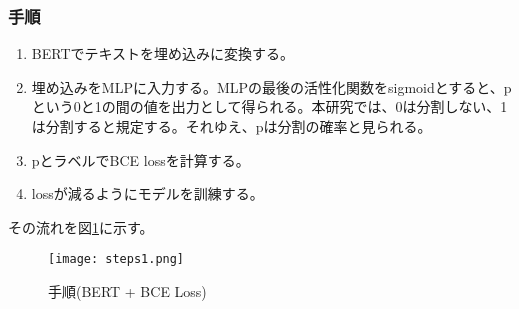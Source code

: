 \documentclass[
  platex, dvipdfmx,  %
]{nlp2021}
\begin{document}
\subsubsection{手順}

\begin{enumerate}
  \item BERTでテキストを埋め込みに変換する。
  \item 埋め込みをMLPに入力する。MLPの最後の活性化関数をsigmoidとすると、pという0と1の間の値を出力として得られる。本研究では、0は分割しない、1は分割すると規定する。それゆえ、pは分割の確率と見られる。
  \item pとラベルでBCE lossを計算する。
  \item lossが減るようにモデルを訓練する。
\end{enumerate}

その流れを図\ref{fig:steps1}に示す。

\begin{figure}[t]
  \centering
  \texttt{[image: steps1.png]}
  \caption{手順(BERT + BCE Loss)}
  \label{fig:steps1}
  \end{figure}
\end{document}
